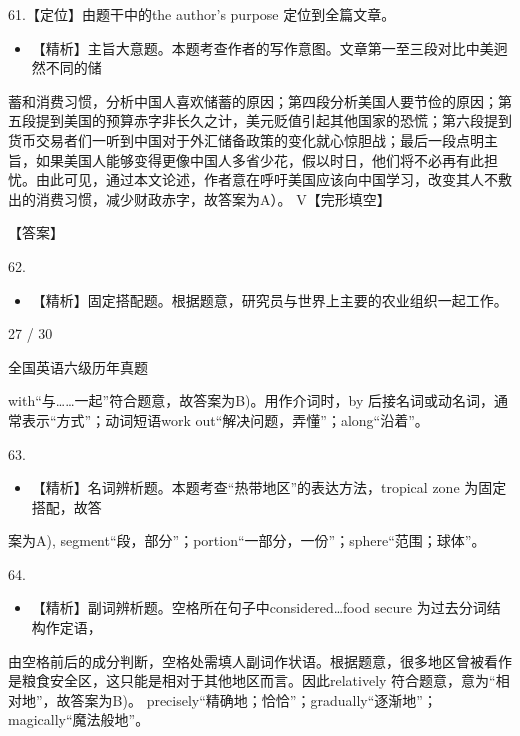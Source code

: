 \documentclass[UTF8,11pt]{ctexart}
\begin{document}
61.【定位】由题干中的the author's purpose 定位到全篇文章。


\begin{itemize}[leftmargin=2em,itemsep=.2em,topsep=.4em]\item[A.] 【精析】主旨大意题。本题考查作者的写作意图。文章第一至三段对比中美迥然不同的储
\end{itemize}

蓄和消费习惯，分析中国人喜欢储蓄的原因；第四段分析美国人要节俭的原因；第五段提到美国的预算赤字非长久之计，美元贬值引起其他国家的恐慌；第六段提到货币交易者们一听到中国对于外汇储备政策的变化就心惊胆战；最后一段点明主旨，如果美国人能够变得更像中国人\textemdash{}多省少花，假以时日，他们将不必再有此担忧。由此可见，通过本文论述，作者意在呼吁美国应该向中国学习，改变其人不敷出的消费习惯，减少财政赤字，故答案为A）。 V【完形填空】


【答案】


62.


\begin{itemize}[leftmargin=2em,itemsep=.2em,topsep=.4em]\item[B.] 【精析】固定搭配题。根据题意，研究员与世界上主要的农业组织一起工作。
\end{itemize}

27 / 30


全国英语六级历年真题


with“与……一起”符合题意，故答案为B)。用作介词时，by 后接名词或动名词，通常表示“方式”；动词短语work out“解决问题，弄懂”；along“沿着”。


63.


\begin{itemize}[leftmargin=2em,itemsep=.2em,topsep=.4em]\item[A.] 【精析】名词辨析题。本题考查“热带地区”的表达方法，tropical zone 为固定搭配，故答
\end{itemize}

案为A), segment“段，部分”；portion“一部分，一份”；sphere“范围；球体”。


64.


\begin{itemize}[leftmargin=2em,itemsep=.2em,topsep=.4em]\item[B.] 【精析】副词辨析题。空格所在句子中considered…food secure 为过去分词结构作定语，
\end{itemize}

由空格前后的成分判断，空格处需填人副词作状语。根据题意，很多地区曾被看作是粮食安全区，这只能是相对于其他地区而言。因此relatively 符合题意，意为“相对地”，故答案为B)。 precisely“精确地；恰恰”；gradually“逐渐地”；magically“魔法般地”。
\end{document}
